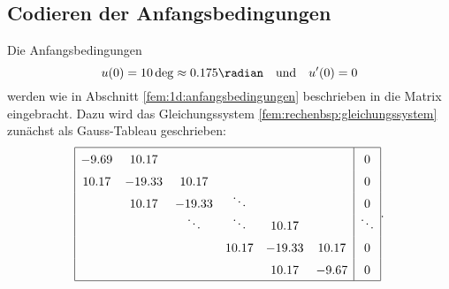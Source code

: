\subsection{Codieren der Anfangsbedingungen}
Die Anfangsbedingungen
\begin{equation}
    u(0) = 10 \deg \approx 0.175 \radian
    \quad \text{und} \quad
    u'(0) = 0
\end{equation}
werden wie in Abschnitt \ref{fem:1d:anfangsbedingungen} beschrieben in die Matrix eingebracht.
Dazu wird das Gleichungssystem \eqref{fem:rechenbsp:gleichungssystem} zunächst als Gauss-Tableau geschrieben:
\begin{equation}
    \def\arraystretch{1.5}
    \begin{array}{|cccccc|c|}
        \hline
        -9.69  & 10.17  &                &                &        &        & 0              \\
        10.17  &-19.33  & 10.17          &                &        &        & 0              \\
               & 10.17  &-19.33          & \smash{\ddots} &        &        & 0              \\
               &        & \smash{\ddots} & \smash{\ddots} & 10.17  &        & \smash{\ddots} \\
               &        &                & 10.17          &-19.33  & 10.17  & 0              \\
               &        &                &                & 10.17  & -9.67  & 0              \\
        \hline
    \end{array}.
\end{equation}

